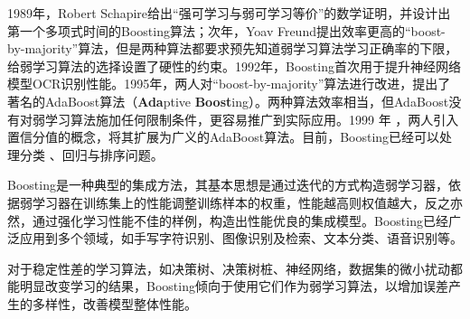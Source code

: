 1989年，Robert Schapire\cite{schapire1990strength}给出“强可学习与弱可学习等价”的数学证明，并设计出第一个多项式时间的Boosting算法；次年，Yoav Freund\cite{freund1990boosting}提出效率更高的“boost-by-majority”算法，但是两种算法都要求预先知道弱学习算法学习正确率的下限，给弱学习算法的选择设置了硬性的约束。1992年，Boosting首次用于提升神经网络模型OCR识别性能\cite{drucker1992improving,drucker1993boosting}。1995年，两人对“boost-by-majority”算法进行改进，提出了著名的AdaBoost算法（\textbf{Ada}ptive \textbf{Boost}ing）\cite{freund1995desicion}。两种算法效率相当，但AdaBoost没有对弱学习算法施加任何限制条件，更容易推广到实际应用。1999 年
\cite{schapire1999improved}，两人引入置信分值的概念，将其扩展为广义的AdaBoost算法。目前，Boosting已经可以处理分类
\cite{freund1995desicion,friedman2000additive}、回归\cite{duffy2002boosting}与排序问题\cite{freund2003efficient,xu2007adarank}。

Boosting是一种典型的集成方法，其基本思想是通过迭代的方式构造弱学习器，依据弱学习器在训练集上的性能调整训练样本的权重，性能越高则权值越大，反之亦然，通过强化学习性能不佳的样例，构造出性能优良的集成模型。Boosting已经广泛应用到多个领域，如手写字符识别、图像识别及检索、文本分类、语音识别等。

对于稳定性差的学习算法，如决策树、决策树桩、神经网络，数据集的微小扰动都能明显改变学习的结果，Boosting倾向于使用它们作为弱学习算法，以增加误差产生的多样性，改善模型整体性能。
